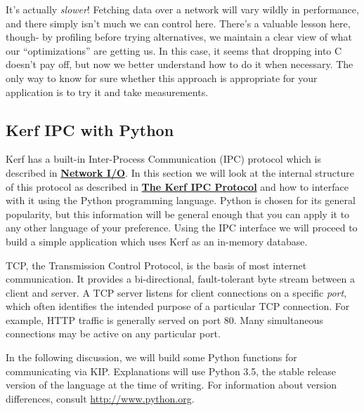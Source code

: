 \documentclass{article}
\begin{document}
It's actually \emph{slower}! Fetching data over a network will vary wildly in performance, and there simply isn't much we can control here. There's a valuable lesson here, though- by profiling before trying alternatives, we maintain a clear view of what our ``optimizations'' are getting us. In this case, it seems that dropping into C doesn't pay off, but now we better understand how to do it when necessary. The only way to know for sure whether this approach is appropriate for your application is to try it and take measurements.

\pagebreak
\subsection{Kerf IPC with Python}\label{sec:pythonkip}

Kerf has a built-in Inter-Process Communication (IPC) protocol which is described in \hyperref[sec:netio]{\textbf{Network I/O}}. In this section we will look at the internal structure of this protocol as described in \hyperref[sec:kipspec]{\textbf{The Kerf IPC Protocol}} and how to interface with it using the Python programming language. Python is chosen for its general popularity, but this information will be general enough that you can apply it to any other language of your preference. Using the IPC interface we will proceed to build a simple application which uses Kerf as an in-memory database.

\vspace{0.5cm}

TCP, the Transmission Control Protocol, is the basis of most internet communication. It provides a bi-directional, fault-tolerant byte stream between a client and server. A TCP server listens for client connections on a specific \emph{port}, which often identifies the intended purpose of a particular TCP connection. For example, HTTP traffic is generally served on port 80. Many simultaneous connections may be active on any particular port.

\vspace{0.5cm}

In the following discussion, we will build some Python functions for communicating via KIP. Explanations will use Python 3.5, the stable release version of the language at the time of writing. For information about version differences, consult \url{http://www.python.org}.

\vspace{0.5cm}
\end{document}
